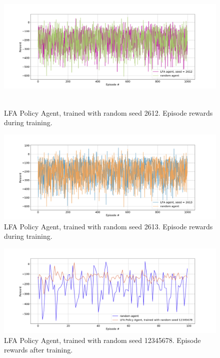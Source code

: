 \documentclass[11pt,a4paper]{article}
\begin{document}
	\begin{figure}
	\begin{center}
		\includegraphics[width = 20cm]{2612.png}
		\
		\caption{LFA Policy Agent, trained with random seed 2612. Episode rewards during training.}
		\label{fig:2}
	\end{center}
	\end{figure}
	\begin{figure}
	\begin{center}
		\includegraphics[width = 20cm]{2613.png}
		\caption{LFA Policy Agent, trained with random seed 2613. Episode rewards during training.}
		\label{fig:3}
	\end{center}
	\end{figure}

	\begin{figure}
	\begin{center}
		\includegraphics[width = 20cm]{12345678_eval.png}
		\caption{LFA Policy Agent, trained with random seed 12345678. Episode rewards after training.}
		\label{fig:4}
	\end{center}
	\end{figure}
\end{document}
